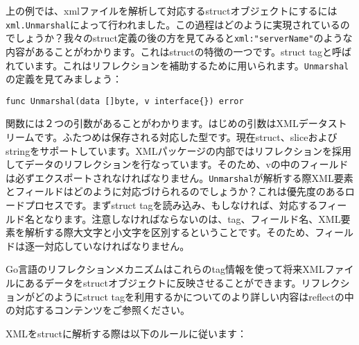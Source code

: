 上の例では、xmlファイルを解析して対応するstructオブジェクトにするには\texttt{xml.Unmarshal}によって行われました。この過程はどのように実現されているのでしょうか？我々のstruct定義の後の方を見てみると\texttt{xml:"serverName"}のような内容があることがわかります。これはstructの特徴の一つです。struct tagと呼ばれています。これはリフレクションを補助するために用いられます。\texttt{Unmarshal}の定義を見てみましょう：

\begin{lstlisting}[numbers=none]
func Unmarshal(data []byte, v interface{}) error
\end{lstlisting}

関数には２つの引数があることがわかります。はじめの引数はXMLデータストリームです。ふたつめは保存される対応した型です。現在struct、sliceおよびstringをサポートしています。XMLパッケージの内部ではリフレクションを採用してデータのリフレクションを行なっています。そのため、vの中のフィールドは必ずエクスポートされなければなりません。\texttt{Unmarshal}が解析する際XML要素とフィールドはどのように対応づけられるのでしょうか？これは優先度のあるロードプロセスです。まずstruct tagを読み込み、もしなければ、対応するフィールド名となります。注意しなければならないのは、tag、フィールド名、XML要素を解析する際大文字と小文字を区別するということです。そのため、フィールドは逐一対応していなければなりません。

Go言語のリフレクションメカニズムはこれらのtag情報を使って将来XMLファイルにあるデータをstructオブジェクトに反映させることができます。リフレクションがどのようにstruct tagを利用するかについてのより詳しい内容はreflectの中の対応するコンテンツをご参照ください。

XMLをstructに解析する際は以下のルールに従います：



